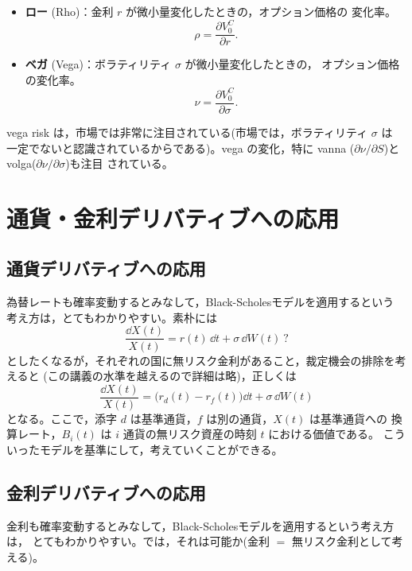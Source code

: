 \begin{itemize}
\item \textbf{ロー} (Rho)：金利 $r$ が微小量変化したときの，オプション価格の
変化率。
\begin{equation}
\rho = \frac{\partial V_0^C}{\partial r}.
\end{equation}
\item \textbf{ベガ} (Vega)：ボラティリティ $\sigma$ が微小量変化したときの，
オプション価格の変化率。
\begin{equation}
\nu = \frac{\partial V_0^C}{\partial\sigma}.
\end{equation}
\end{itemize}

vega risk は，市場では非常に注目されている(市場では，ボラティリティ $\sigma$ は
一定でないと認識されているからである)。vega の変化，特に vanna
($\partial\nu/\partial S$)と volga($\partial\nu/\partial\sigma$)も注目
されている。

\section{通貨・金利デリバティブへの応用}

\subsection{通貨デリバティブへの応用}

為替レートも確率変動するとみなして，Black-Scholesモデルを適用するという
考え方は，とてもわかりやすい。素朴には
\[
\frac{\dd X(t)}{X(t)} = r(t)\,\dd t + \sigma\,\dd W(t)\ ?
\]
としたくなるが，それぞれの国に無リスク金利があること，裁定機会の排除を考えると
(この講義の水準を越えるので詳細は略)，正しくは
\begin{equation}
\frac{\dd X(t)}{X(t)} = \bigl(r_d(t) - r_f(t)\bigr)\dd t + \sigma\,\dd W(t)
\end{equation}
となる。ここで，添字 $d$ は基準通貨，$f$ は別の通貨，$X(t)$ は基準通貨への
換算レート，$B_i(t)$ は $i$ 通貨の無リスク資産の時刻 $t$ における価値である。
こういったモデルを基準にして，考えていくことができる。

\subsection{金利デリバティブへの応用}

金利も確率変動するとみなして，Black-Scholesモデルを適用するという考え方は，
とてもわかりやすい。では，それは可能か(金利 $=$ 無リスク金利として考える)。

